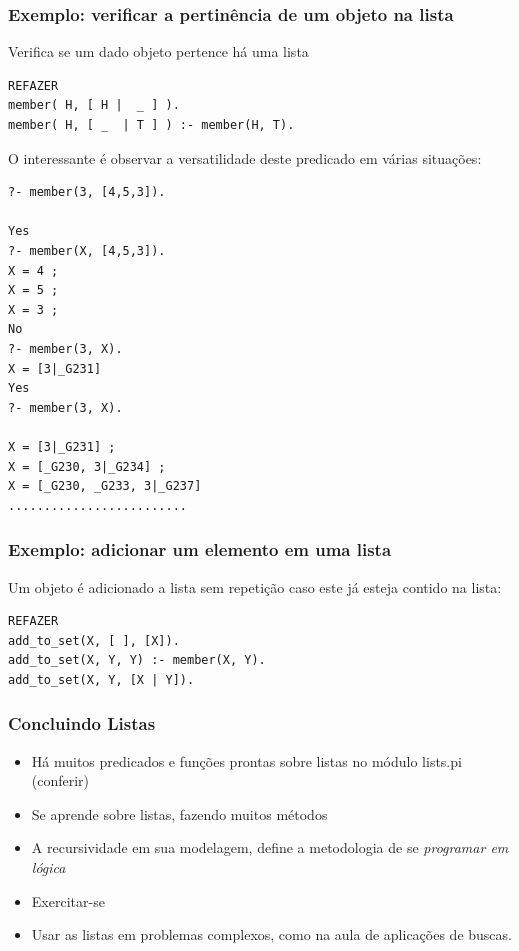 \begin{frame}[fragile, allowframebreaks=0.9]
\frametitle{Exemplo: verificar a pertinência de um objeto na lista}

Verifica se um dado objeto pertence há uma  lista
 \begin{verbatim}
REFAZER
member( H, [ H |  _ ] ).
member( H, [ _  | T ] ) :- member(H, T).
\end{verbatim}

O interessante é observar a versatilidade 
deste  predicado em várias situações:
\begin{verbatim}
?- member(3, [4,5,3]).

Yes
?- member(X, [4,5,3]).
X = 4 ;
X = 5 ;
X = 3 ;
No
?- member(3, X).
X = [3|_G231] 
Yes
?- member(3, X).

X = [3|_G231] ;
X = [_G230, 3|_G234] ;
X = [_G230, _G233, 3|_G237] 
.........................
\end{verbatim}


\end{frame}



\begin{frame}[fragile, allowframebreaks=0.9]
\frametitle{Exemplo: adicionar um elemento  em uma lista}

Um objeto é adicionado a lista
sem repeti\c{c}ão caso este já
 esteja contido na lista:
 
\begin{verbatim}
REFAZER
add_to_set(X, [ ], [X]).
add_to_set(X, Y, Y) :- member(X, Y).
add_to_set(X, Y, [X | Y]).
\end{verbatim}

\end{frame}


\begin{frame}[fragile]
\frametitle{Concluindo Listas}

\begin{block}{}
\begin{itemize}
  \item Há muitos predicados e funções prontas sobre listas no módulo lists.pi (conferir)
  \item Se aprende sobre listas, fazendo muitos métodos
  \item A recursividade em sua modelagem, define a metodologia de se \textit{programar em lógica}
  \item Exercitar-se
  \item Usar as listas em problemas complexos, como na aula de aplicações de buscas.
  
\end{itemize}

\end{block}

\end{frame}














